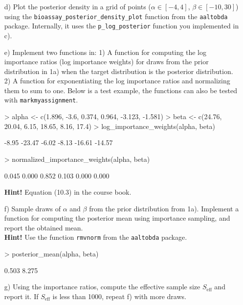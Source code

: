 \documentclass[11pt,a4paper,english]{article}
\begin{document}
\begin{enumerate}
\begin{itemize}
\item[d)] Plot the posterior density in a grid of points ($\alpha \in [-4,4]$, $\beta \in [-10,30]$) using the {\tt bioassay\_posterior\_density\_plot} function from the {\tt aaltobda} package. Internally, it uses the {\tt p\_log\_posterior} function you implemented in c).
\item[e)] Implement two functions in: 1) A function for computing the log importance ratios (log importance weights) for draws from the prior distribution in 1a) when the target distribution is the posterior distribution. 2) A function for exponentiating the log importance ratios and normalizing them to sum to one. Below is a test example, the functions can also be tested with \texttt{markmyassignment}.\\
\begin{Schunk}
\begin{Sinput}
> alpha <- c(1.896, -3.6,  0.374, 0.964, -3.123, -1.581)
> beta <- c(24.76, 20.04, 6.15, 18.65, 8.16, 17.4)
> log_importance_weights(alpha, beta)
\end{Sinput}
\begin{Soutput}
[1]  -8.95 -23.47  -6.02  -8.13 -16.61 -14.57
\end{Soutput}
\begin{Sinput}
> normalized_importance_weights(alpha, beta)
\end{Sinput}
\begin{Soutput}
[1] 0.045 0.000 0.852 0.103 0.000 0.000
\end{Soutput}
\end{Schunk}
\textbf{Hint!} Equation (10.3) in the course book.
\item[f)] Sample draws of $\alpha$ and $\beta$ from the prior distribution from 1a). Implement a function for computing the posterior mean using importance sampling, and report the obtained mean.\\
\textbf{Hint!} Use the function {\tt rmvnorm} from the {\tt aaltobda} package.
\begin{Schunk}
\begin{Sinput}
> posterior_mean(alpha, beta)
\end{Sinput}
\begin{Soutput}
[1] 0.503 8.275
\end{Soutput}
\end{Schunk}
\item[g)] Using the importance ratios, compute the effective sample size $S_{\text{eff}}$ and report it. If $S_{\text{eff}}$ is less than 1000, repeat f) with more draws.\\

\end{itemize}
\end{enumerate}
\end{document}
